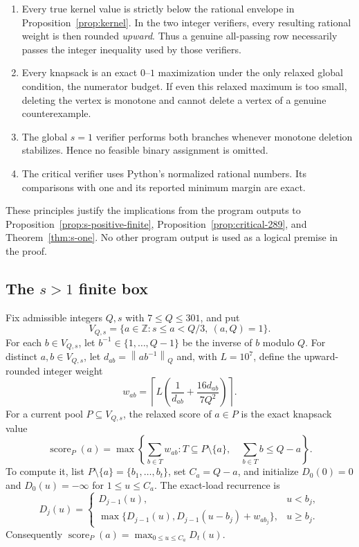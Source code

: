 \documentclass[11pt]{article}
\theoremstyle{definition}
\theoremstyle{remark}
\newcommand{\Z}{\mathbb Z}
\newcommand{\normQ}[1]{\left\lVert #1\right\rVert_Q}
\begin{document}
\begin{enumerate}[label=(\roman*)]
\item Every true kernel value is strictly below the rational envelope in
Proposition~\ref{prop:kernel}.  In the two integer verifiers, every resulting
rational weight is then rounded \emph{upward}.  Thus a genuine all-passing
row necessarily passes the integer inequality used by those verifiers.

\item Every knapsack is an exact \(0\)--\(1\) maximization under the only
relaxed global condition, the numerator budget.  If even this relaxed
maximum is too small, deleting the vertex is monotone and cannot delete a
vertex of a genuine counterexample.

\item The global \(s=1\) verifier performs both branches whenever monotone
deletion stabilizes.  Hence no feasible binary assignment is omitted.

\item The critical verifier uses Python's normalized rational numbers.  Its
comparisons with one and its reported minimum margin are exact.
\end{enumerate}

These principles justify the implications from the program outputs to
Proposition~\ref{prop:s-positive-finite},
Proposition~\ref{prop:critical-289}, and Theorem~\ref{thm:s-one}.  No other
program output is used as a logical premise in the proof.

\subsection{The \texorpdfstring{\(s>1\)}{s > 1} finite box}
\label{app:s-positive-verifier}

Fix admissible integers \(Q,s\) with \(7\le Q\le301\), and put
\[
 V_{Q,s}=\{a\in\Z:s\le a<Q/3,\ (a,Q)=1\}.
\]
For each \(b\in V_{Q,s}\), let
\(b^{-1}\in\{1,\ldots,Q-1\}\) be the inverse of \(b\) modulo \(Q\).
For distinct \(a,b\in V_{Q,s}\), let \(d_{ab}=\normQ{ab^{-1}}\) and,
with \(L=10^7\), define the upward-rounded integer weight
\begin{equation}\label{eq:rounded-weight}
 w_{ab}=\left\lceil L\left(\frac1{d_{ab}}
              +\frac{16d_{ab}}{7Q^2}\right)\right\rceil.
\end{equation}
For a current pool \(P\subseteq V_{Q,s}\), the relaxed score of \(a\in P\)
is the exact knapsack value
\[
 \operatorname{score}_P(a)=
 \max\left\{
   \sum_{b\in T}w_{ab}:
   T\subseteq P\setminus\{a\},\quad
   \sum_{b\in T}b\le Q-a
 \right\}.
\]
To compute it, list \(P\setminus\{a\}=\{b_1,\ldots,b_t\}\), set
\(C_a=Q-a\), and initialize \(D_0(0)=0\) and
\(D_0(u)=-\infty\) for \(1\le u\le C_a\).  The exact-load recurrence is
\[
 D_j(u)=
 \begin{cases}
  D_{j-1}(u),&u<b_j,\\
  \max\{D_{j-1}(u),D_{j-1}(u-b_j)+w_{ab_j}\},&u\ge b_j.
 \end{cases}
\]
Consequently
\(\operatorname{score}_P(a)=\max_{0\le u\le C_a}D_t(u)\).
\end{document}
